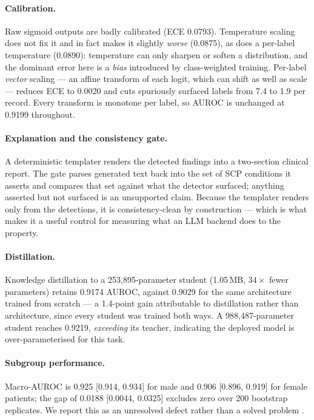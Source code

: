 \documentclass[pmlr,twocolumn,10pt]{jmlr}
\begin{document}
\paragraph{Calibration.} Raw sigmoid outputs are badly calibrated (ECE 0.0793). Temperature
scaling \citep{guo2017calibration} does not fix it and in fact makes it slightly
\emph{worse} (0.0875), as does a per-label temperature (0.0890): temperature can only
sharpen or soften a distribution, and the dominant error here is a \emph{bias} introduced by
class-weighted training. Per-label \emph{vector} scaling --- an affine transform of each
logit, which can shift as well as scale --- reduces ECE to 0.0020 and cuts spuriously
surfaced labels from 7.4 to 1.9 per record. Every transform is monotone per label, so AUROC
is unchanged at 0.9199 throughout.

\paragraph{Explanation and the consistency gate.} A deterministic templater renders the
detected findings into a two-section clinical report. The gate parses generated text back
into the set of SCP conditions it asserts and compares that set against what the detector
surfaced; anything asserted but not surfaced is an unsupported claim. Because the templater
renders only from the detections, it is consistency-clean by construction --- which is what
makes it a useful control for measuring what an LLM backend does to the property.

\paragraph{Distillation.} Knowledge distillation \citep{hinton2015distilling} to a
253{,}895-parameter student (1.05\,MB, $34\times$ fewer parameters) retains 0.9174 AUROC, against
0.9029 for the same architecture trained from scratch --- a 1.4-point gain attributable to
distillation rather than architecture, since every student was trained both ways. A
988{,}487-parameter student reaches 0.9219, \emph{exceeding} its teacher, indicating the
deployed model is over-parameterised for this task.

\paragraph{Subgroup performance.} Macro-AUROC is 0.925 [0.914, 0.934] for male and
0.906 [0.896, 0.919] for female patients; the gap of 0.0188 [0.0044, 0.0325] excludes zero
over 200 bootstrap replicates. We report this as an unresolved defect rather than a solved
problem \citep{obermeyer2019dissecting}.
\end{document}
